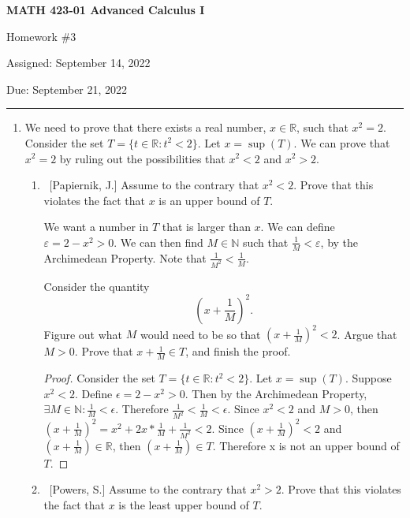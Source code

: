 \documentclass[10pt]{article}
\begin{document}
\pagestyle{empty}  %

\begin{center}  %

{\bf MATH 423-01  Advanced Calculus I

Homework \#3

Assigned: September 14, 2022

Due: September 21, 2022}

\end{center}

\medskip

\hrule   %

\bigskip


\begin{enumerate}


\item  We need to prove that there exists a real number, $x \in \mathbb{R}$, such that $x^2 = 2$.  Consider the set $T = \{t \in \mathbb{R}: t^2 < 2\}$.  Let $x = \sup{(T)}$.  We can prove that $x^2 = 2$ by ruling out the possibilities that $x^2 < 2$ and $x^2 > 2$.

	\begin{enumerate}
	
	\item  ~[Papiernik, J.] Assume to the contrary that $x^2 < 2$.  Prove that this violates the fact that $x$ is an upper bound of $T$.
	
	We want a number in $T$ that is larger than $x$.  We can define $\varepsilon = 2-x^2 > 0$.  We can then find $M \in \mathbb{N}$ such that $\frac{1}{M} < \varepsilon$, by the Archimedean Property.  Note that $\frac{1}{M^2} < \frac{1}{M}$.
	
	Consider the quantity $$\left( x + \frac{1}{M} \right)^2.$$  Figure out what $M$ would need to be so that $\left( x + \frac{1}{M} \right)^2 < 2$.  Argue that $M > 0$.  Prove that $x + \frac{1}{M} \in T$, and finish the proof.

 \begin{proof}
   Consider the set $T = \{t \in \mathbb{R}: t^2 < 2\}$.  Let $x = \sup{(T)}$.  Suppose $x^2 < 2$. Define $\epsilon = 2-x^2 > 0$.  Then by the Archimedean Property, $\exists M \in \mathbb{N}: \frac{1}{M}<\epsilon$.  Therefore $\frac{1}{M^2}<\frac{1}{M}<\epsilon$.  Since $x^2<2$ and $M>0$, then $(x + \frac{1}{M})^2 = x^2+2x*\frac{1}{M}+\frac{1}{M^2}<2$.  Since $(x+\frac{1}{M})^2 < 2$ and $(x+\frac{1}{M}) \in \mathbb{R}$, then $(x+\frac{1}{M}) \in T$.  Therefore x is not an upper bound of $T$.
 \end{proof}
	\item  ~[Powers, S.] Assume to the contrary that $x^2 > 2$.  Prove that this violates the fact that $x$ is the least upper bound of $T$.
	

\end{enumerate}
\end{enumerate}
\end{document}
